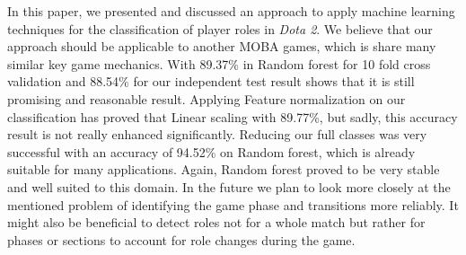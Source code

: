 In this paper, we presented and discussed an approach to apply machine learning techniques for the classification of player roles in \textit{Dota 2}. We believe that our approach should be applicable to another MOBA games, which is share many similar key game mechanics. With 89.37\% in Random forest for 10 fold cross validation and 88.54\% for our independent test result shows that it is still promising and reasonable result. Applying Feature normalization on our classification has proved that Linear scaling with 89.77\%, but sadly, this accuracy result is not really enhanced significantly. Reducing our full classes was very successful with an accuracy of 94.52\% on Random forest, which is already suitable for many applications. Again, Random forest proved to be very stable and well suited to this domain. In the future we plan to look more closely at the mentioned problem of identifying the game phase and transitions more reliably. It might also be beneficial to detect roles not for a whole match but rather for phases or sections to account for role changes during the game.